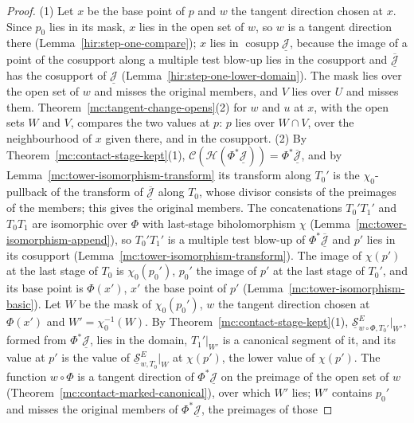 \begin{proof}
\leanok
(1) Let \(x\) be the base point of \(p\) and \(w\) the tangent direction chosen at \(x\). Since \(p_0\) lies in its mask, \(x\) lies in the open set of \(w\), so \(w\) is a
tangent direction there (Lemma~\ref{hir:step-one-compare}); \(x\) lies in \(\operatorname{cosupp}\underline{\mathcal J}\), because the image of a point of the cosupport along a
multiple test blow-up lies in the cosupport and \(\overline{\underline{\mathcal J}}\) has the cosupport of \(\underline{\mathcal J}\) (Lemma~\ref{hir:step-one-lower-domain}). The mask lies
over the open set of \(w\) and misses the original members, and \(V\) lies over \(U\) and misses them. Theorem~\ref{mc:tangent-change-opens}(2) for \(w\) and \(u\) at \(x\), with the
open sets \(W\) and \(V\), compares the two values at \(p\): \(p\) lies over \(W\cap V\), over the neighbourhood of \(x\) given there, and in the cosupport.
(2) By Theorem~\ref{mc:contact-stage-kept}(1), \(\mathcal C(\mathcal H(\Phi^*\underline{\mathcal J}))=\Phi^*\overline{\underline{\mathcal J}}\), and by
Lemma~\ref{mc:tower-isomorphism-transform} its transform along \(T_0'\) is the \(\chi_0\)-pullback of the transform of \(\overline{\underline{\mathcal J}}\) along \(T_0\), whose divisor
consists of the preimages of the members; this gives the original members. The concatenations \(T_0'T_1'\) and \(T_0T_1\) are isomorphic over \(\Phi\) with last-stage
biholomorphism \(\chi\) (Lemma~\ref{mc:tower-isomorphism-append}), so \(T_0'T_1'\) is a multiple test blow-up of \(\Phi^*\overline{\underline{\mathcal J}}\) and \(p'\) lies in its
cosupport (Lemma~\ref{mc:tower-isomorphism-transform}). The image of \(\chi(p')\) at the last stage of \(T_0\) is \(\chi_0(p_0')\), \(p_0'\) the image of \(p'\) at the last stage of
\(T_0'\), and its base point is \(\Phi(x')\), \(x'\) the base point of \(p'\) (Lemma~\ref{mc:tower-isomorphism-basic}). Let \(W\) be the mask of \(\chi_0(p_0')\), \(w\) the tangent
direction chosen at \(\Phi(x')\) and \(W'=\chi_0^{-1}(W)\). By Theorem~\ref{mc:contact-stage-kept}(1), \(\underline{\mathcal S}^E_{w\circ\Phi,T_0'}|_{W'}\), formed from
\(\Phi^*\underline{\mathcal J}\), lies in the domain, \(T_1'|_{W'}\) is a canonical segment of it, and its value at \(p'\) is the value of \(\underline{\mathcal S}^E_{w,T_0}|_W\) at
\(\chi(p')\), the lower value of \(\chi(p')\). The function \(w\circ\Phi\) is a tangent direction of \(\Phi^*\underline{\mathcal J}\) on the preimage of the open set of \(w\)
(Theorem~\ref{mc:contact-marked-canonical}), over which \(W'\) lies; \(W'\) contains \(p_0'\) and misses the original members of \(\Phi^*\underline{\mathcal J}\), the preimages of those

\end{proof}
